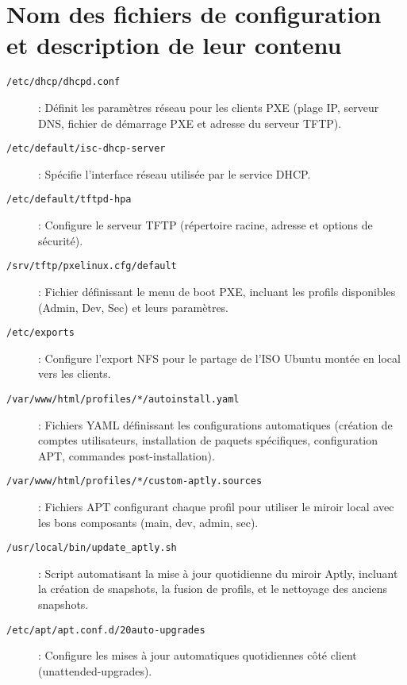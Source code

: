 \documentclass[a4paper,12pt]{article}
\begin{document}
\section{Nom des fichiers de configuration et description de leur contenu}

\begin{description}

\item[\texttt{/etc/dhcp/dhcpd.conf}] :
Définit les paramètres réseau pour les clients PXE (plage IP, serveur DNS, fichier de démarrage PXE et adresse du serveur TFTP).

\item[\texttt{/etc/default/isc-dhcp-server}]:
Spécifie l'interface réseau utilisée par le service DHCP.

\item[\texttt{/etc/default/tftpd-hpa}]:
Configure le serveur TFTP (répertoire racine, adresse et options de sécurité).

\item[\texttt{/srv/tftp/pxelinux.cfg/default}]:
Fichier définissant le menu de boot PXE, incluant les profils disponibles (Admin, Dev, Sec) et leurs paramètres.

\item[\texttt{/etc/exports}]:
Configure l’export NFS pour le partage de l’ISO Ubuntu montée en local vers les clients.

\item[\texttt{/var/www/html/profiles/*/autoinstall.yaml}]:
Fichiers YAML définissant les configurations automatiques (création de comptes utilisateurs, installation de paquets spécifiques, configuration APT, commandes post-installation).

\item[\texttt{/var/www/html/profiles/*/custom-aptly.sources}]:
Fichiers APT configurant chaque profil pour utiliser le miroir local avec les bons composants (main, dev, admin, sec).

\item[\texttt{/usr/local/bin/update\_aptly.sh}]:
Script automatisant la mise à jour quotidienne du miroir Aptly, incluant la création de snapshots, la fusion de profils, et le nettoyage des anciens snapshots.

\item[\texttt{/etc/apt/apt.conf.d/20auto-upgrades}]:
Configure les mises à jour automatiques quotidiennes côté client (unattended-upgrades).

\end{description}
\end{document}
